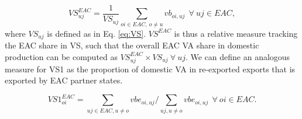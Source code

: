 \documentclass[a4paper]{article}
\begin{document}
\begin{equation} \label{eq:VS_EAC}
VS_{uj}^{EAC} = \frac{1}{VS_{uj}}  \sum_{oi \in EAC,\ o \neq  u} vb_{oi, uj}   \ \ \forall\ uj \in EAC,
\end{equation}
where $VS_{uj}$ is defined as in Eq. \ref{eq:VS}. $VS^{EAC}$ is thus a relative measure tracking the EAC share in VS, such that the overall EAC VA share in domestic production can be computed as $VS_{uj}^{EAC} \times VS_{uj} \ \forall\ uj$. We can define an analogous measure for VS1 as the proportion of domestic VA in re-exported exports that is exported by EAC partner states. 

\begin{equation} \label{eq:VS1_EAC}
VS1_{oi}^{EAC} =  \sum_{uj \in EAC, u \neq  o} vbe_{oi, uj} \bigg/ \sum_{uj, u \neq  o} vbe_{oi, uj}\ \ \forall\ oi \in EAC.
\end{equation}
\end{document}
